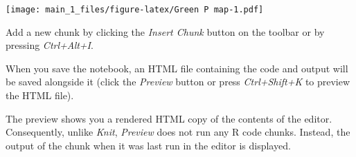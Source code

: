 \documentclass[
]{article}
\newenvironment{Shaded}{\begin{snugshade}}{\end{snugshade}}
\newcommand{\AttributeTok}[1]{\textcolor[rgb]{0.77,0.63,0.00}{#1}}
\newcommand{\CommentTok}[1]{\textcolor[rgb]{0.56,0.35,0.01}{\textit{#1}}}
\newcommand{\FunctionTok}[1]{\textcolor[rgb]{0.00,0.00,0.00}{#1}}
\newcommand{\NormalTok}[1]{#1}
\newcommand{\SpecialCharTok}[1]{\textcolor[rgb]{0.00,0.00,0.00}{#1}}
\newcommand{\StringTok}[1]{\textcolor[rgb]{0.31,0.60,0.02}{#1}}
\begin{document}
\begin{Shaded}
\end{Shaded}

\texttt{[image: main\_1\_files/figure-latex/Green P map-1.pdf]}

Add a new chunk by clicking the \emph{Insert Chunk} button on the
toolbar or by pressing \emph{Ctrl+Alt+I}.

When you save the notebook, an HTML file containing the code and output
will be saved alongside it (click the \emph{Preview} button or press
\emph{Ctrl+Shift+K} to preview the HTML file).

The preview shows you a rendered HTML copy of the contents of the
editor. Consequently, unlike \emph{Knit}, \emph{Preview} does not run
any R code chunks. Instead, the output of the chunk when it was last run
in the editor is displayed.
\end{document}
